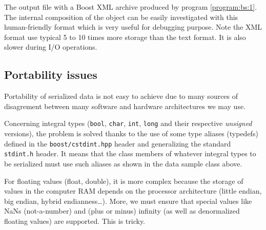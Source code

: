 \documentclass[a4paper,12pt]{article}
\newcommand{\basepath}{.}
\newcommand{\codingpath}{\basepath/coding}
\begin{document}
\begin{sample}[h]
\VerbatimInput[frame=single,
numbers=left,
numbersep=2pt,
firstline=1,
fontsize=\footnotesize,
showspaces=false]{\codingpath/stored_data.xml}
\caption{The output file with a  Boost XML archive produced by program
  \ref{program:bs:1}. The  internal composition  of the object  can be
  easily investigated  with this  human-friendly format which  is very
  useful for debugging  purpose. Note the XML format  use typical 5 to
  10 times more storage than the text format. It is also slower during
  I/O operations.  }
\label{sample:bs:1b}
\end{sample}

\clearpage

\subsection{Portability issues}

Portability  of serialized data  is not  easy to  achieve due  to many
sources   of   disagrement   between   many  software   and   hardware
architectures we may use.

Concerning    integral     types    (\texttt{bool},    \texttt{char},
\texttt{int},  \texttt{long}   and  their  respective  \emph{unsigned}
versions),  the problem  is  solved thanks  to  the use  of some  type
aliases  (typedefs) defined  in the  \texttt{boost/cstdint.hpp} header
and generalizing the standard  \texttt{stdint.h} header. It means that
the class members of whatever integral types to be serialized must use
such aliases as shown in the data sample class above.

For floating  values (float, double),  it is more  complex because
the storage  of values  in the computer  RAM depends on  the processor
architecture (little endian,  big endian, hybrid endianness\dots). More,
we must ensure that special  values like NaNs (not-a-number) and (plus
or  minus) infinity  (as  well as  denormalized  floating values)  are
supported. This is tricky.
\end{document}
